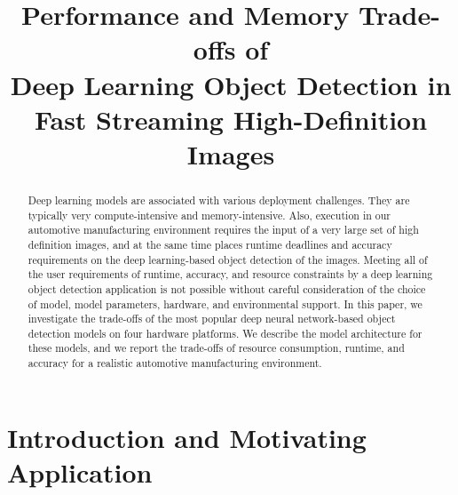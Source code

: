 \documentclass[conference]{IEEEtran}
\begin{document}

\title{Performance and Memory Trade-offs of \\ Deep Learning Object Detection in \\ Fast Streaming High-Definition Images}

\maketitle

\thispagestyle{plain}
\pagestyle{plain}



\begin{abstract}
Deep learning models are associated with various deployment challenges. They are typically very compute-intensive and memory-intensive.
Also, execution in our automotive manufacturing environment requires the input of a very large set of high definition images, and at the same time places runtime deadlines and accuracy requirements on the deep learning-based object detection of the images.
Meeting all of the user requirements of runtime, accuracy, and resource constraints by a deep learning object detection application is not possible without careful consideration of the choice of model, model parameters, hardware, and environmental support.
In this paper, we investigate the trade-offs of the most popular deep neural network-based object detection models on four hardware platforms. 
We describe the model architecture for these models, and
we report the trade-offs of resource consumption, runtime, and accuracy for a realistic automotive manufacturing environment.
\end{abstract}


\IEEEpeerreviewmaketitle

\nocite{*}

\section{Introduction and Motivating Application}
\end{document}

